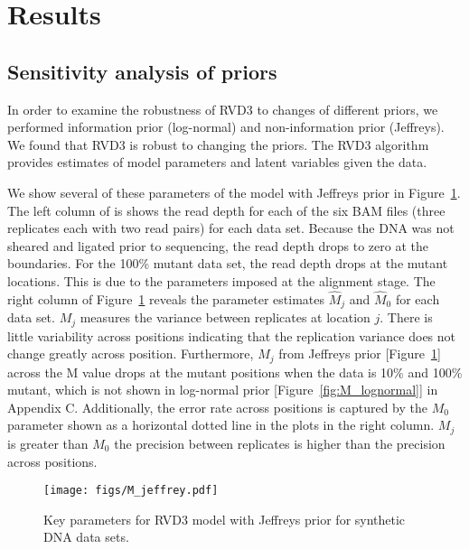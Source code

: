 \documentclass[11pt,reqno]{amsart}
\begin{document}
\section{Results}

\subsection{Sensitivity analysis of priors}
In order to examine the robustness of RVD3 to changes of different priors, we performed information prior (log-normal) and non-information prior (Jeffreys). We found that RVD3 is robust to changing the priors. The RVD3 algorithm provides estimates of model parameters and latent variables given the data.

We show several of these parameters of the model with Jeffreys prior in Figure~\ref{fig:M_jeffrey}. The left column of is shows the read depth for each of the six BAM files (three replicates each with two read pairs) for each data set. Because the DNA was not sheared and ligated prior to sequencing, the read depth drops to zero at the boundaries. For the 100\% mutant data set, the read depth drops at the mutant locations. This is due to the parameters imposed at the alignment stage. The right column of Figure~\ref{fig:M_jeffrey} reveals the parameter estimates $\hat{M}_j$ and $\hat{M}_0$ for each data set. $M_j$ measures the variance between replicates at location $j$. There is little variability across positions indicating that the replication variance does not change greatly across position. Furthermore, $M_j$ from Jeffreys prior [Figure~\ref{fig:M_jeffrey}] across the M value drops at the mutant positions when the data is 10\% and 100\% mutant, which is not shown in log-normal prior [Figure~\ref{fig:M_lognormal}] in Appendix C. Additionally, the error rate across positions is captured by the $M_0$ parameter shown as a horizontal dotted line in the plots in the right column. $M_j$ is greater than $M_0$ the precision between replicates is higher than the precision across positions.

\begin{figure}[htbp]
\begin{center}
\texttt{[image: figs/M\_jeffrey.pdf]}
\caption{Key parameters for RVD3 model with Jeffreys prior for synthetic DNA data sets.}
\label{fig:M_jeffrey}
\end{center}
\end{figure}
\end{document}
